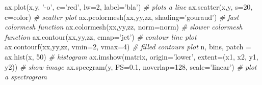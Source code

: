 \documentclass[10pt,a4paperpaper,twocolumn]{article}
\newenvironment{Shaded}{}{}
\newcommand{\DecValTok}[1]{\textcolor[rgb]{0.25,0.63,0.44}{{#1}}}
\newcommand{\FloatTok}[1]{\textcolor[rgb]{0.25,0.63,0.44}{{#1}}}
\newcommand{\StringTok}[1]{\textcolor[rgb]{0.25,0.44,0.63}{{#1}}}
\newcommand{\CommentTok}[1]{\textcolor[rgb]{0.38,0.63,0.69}{\textit{{#1}}}}
\newcommand{\OperatorTok}[1]{\textcolor[rgb]{0.40,0.40,0.40}{{#1}}}
\newcommand{\NormalTok}[1]{{#1}}
\begin{document}
\begin{Shaded}
\begin{Highlighting}[]
\NormalTok{ax.plot(x,y, }\StringTok{'-o'}\NormalTok{, c}\OperatorTok{=}\StringTok{'red'}\NormalTok{, lw}\OperatorTok{=}\DecValTok{2}\NormalTok{, label}\OperatorTok{=}\StringTok{'bla'}\NormalTok{)  }\CommentTok{# plots a line}
\NormalTok{ax.scatter(x,y, s}\OperatorTok{=}\DecValTok{20}\NormalTok{, c}\OperatorTok{=}\NormalTok{color)                  }\CommentTok{# scatter plot}
\NormalTok{ax.pcolormesh(xx,yy,zz, shading}\OperatorTok{=}\StringTok{'gouraud'}\NormalTok{)      }\CommentTok{# fast colormesh function}
\NormalTok{ax.colormesh(xx,yy,zz, norm}\OperatorTok{=}\NormalTok{norm)               }\CommentTok{# slower colormesh function}
\NormalTok{ax.contour(xx,yy,zz, cmap}\OperatorTok{=}\StringTok{'jet'}\NormalTok{)                }\CommentTok{# contour line plot}
\NormalTok{ax.contourf(xx,yy,zz, vmin}\OperatorTok{=}\DecValTok{2}\NormalTok{, vmax}\OperatorTok{=}\DecValTok{4}\NormalTok{)           }\CommentTok{# filled contours plot}
\NormalTok{n, bins, patch }\OperatorTok{=} \NormalTok{ax.hist(x, }\DecValTok{50}\NormalTok{)                 }\CommentTok{# histogram}
\NormalTok{ax.imshow(matrix, origin}\OperatorTok{=}\StringTok{'lower'}\NormalTok{, extent}\OperatorTok{=}\NormalTok{(x1, x2, y1, y2))  }\CommentTok{# show image}
\NormalTok{ax.specgram(y, FS}\OperatorTok{=}\FloatTok{0.1}\NormalTok{, noverlap}\OperatorTok{=}\DecValTok{128}\NormalTok{, scale}\OperatorTok{=}\StringTok{'linear'}\NormalTok{)  }\CommentTok{# plot a spectrogram}
\end{Highlighting}
\end{Shaded}
\end{document}
